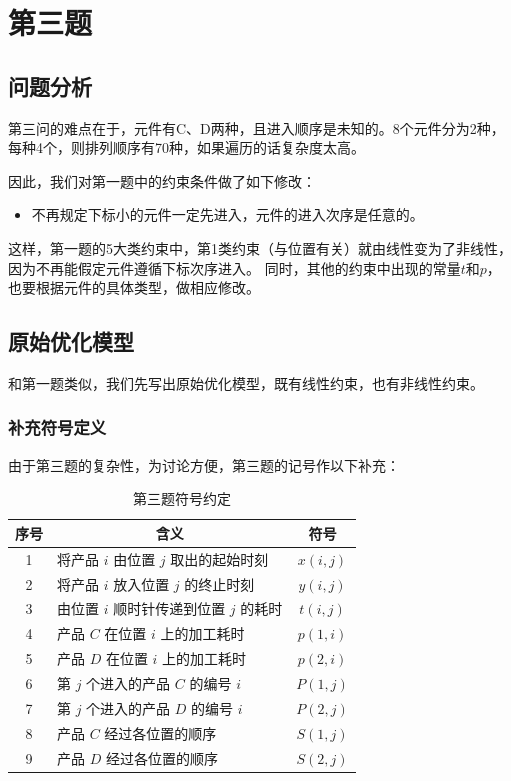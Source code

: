 \documentclass{ctexart}
\begin{document}
\section{第三题}
{
    \subsection{问题分析}
    {
        第三问的难点在于，元件有C、D两种，且进入顺序是未知的。8个元件分为2种，每种4个，则排列顺序有70种，如果遍历的话复杂度太高。

        因此，我们对第一题中的约束条件做了如下修改：
        \begin{itemize}
            \item 不再规定下标小的元件一定先进入，元件的进入次序是任意的。
        \end{itemize}

        这样，第一题的5大类约束中，第1类约束（与位置有关）就由线性变为了非线性，因为不再能假定元件遵循下标次序进入。
        同时，其他的约束中出现的常量$t$和$p$，也要根据元件的具体类型，做相应修改。
		
    }

    \subsection{原始优化模型}
    {
        和第一题类似，我们先写出原始优化模型，既有线性约束，也有非线性约束。

        \subsubsection{补充符号定义}
        {
        	由于第三题的复杂性，为讨论方便，第三题的记号作以下补充：
        	\begin{table}[H]
        		\centering
        		\caption{第三题符号约定}
        		\begin{tabular}{@{}clc@{}}
        			\toprule
        			序号 & \multicolumn{1}{c}{含义} & 符号 \\ \midrule
        			1 & 将产品 $i$ 由位置 $j$ 取出的起始时刻     & $x(i, j)$    \\ 
        			2 & 将产品 $i$ 放入位置 $j$ 的终止时刻     & $y(i, j)$    \\ 
        			3 & 由位置 $i$ 顺时针传递到位置 $j$ 的耗时  & $t(i, j)$   \\
        			4 & 产品 $C$ 在位置 $i$ 上的加工耗时   & $p(1,i)$ \\
        			5 & 产品 $D$ 在位置 $i$ 上的加工耗时   & $p(2,i)$ \\
        			6 & 第 $j$ 个进入的产品 $C$ 的编号 $i$  & $P(1,j)$ \\
        			7 & 第 $j$ 个进入的产品 $D$ 的编号 $i$  & $P(2,j)$ \\
        			8 & 产品 $C$ 经过各位置的顺序  & $S(1,j)$ \\ 
        			9 & 产品 $D$ 经过各位置的顺序  & $S(2,j)$ \\ \bottomrule
        		\end{tabular}
        	\end{table}
        	
}}}
\end{document}
